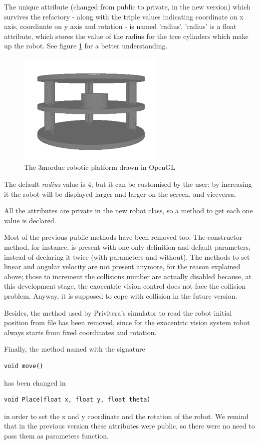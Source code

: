 %
The unique attribute (changed from public to private, in 
the new version) which survives the refactory - along with the
triple values indicating coordinate on x axis, coordinate on 
y axis and rotation - is named 'radius'. 'radius' is a float
attribute, which stores the value of the radius for the 
tree cylinders which make up the robot. See figure
\ref{fig:3morduc_opengl} for a better understanding.
%
\begin{figure}[!h]
  \begin{center}
    \includegraphics[width=200pt]{img/3morduc_opengl.png}  %
    \caption{The 3morduc robotic platform drawn in OpenGL}
    \label{fig:3morduc_opengl}
  \end{center}
\end{figure}
%
The default \textit{radius} value is 4, but it can be 
customised by the user: by increasing it the robot will be 
displayed larger and larger on the screen, and viceversa.
%

%
All the attributes are private in the new robot class, 
so a method to get each one value is declared. 
%

%
Most of the previous public methods have been removed too. 
The constructor method, for instance, is present with one
only definition and default parameters, instead of declaring 
it twice (with parameters and without). The methods to set
linear and angular velocity are not present anymore, for 
the reason explained above; those to increment the collisions 
number are actually disabled because, at this development 
stage, the exocentric vision control does not face the collision 
problem. Anyway, it is supposed to cope with collision in 
the future version.
%

%
Besides, the method used by Privitera's simulator to read 
the robot initial position from file has been removed, since 
for the exocentric vision system robot always starts from 
fixed coordinates and rotation.
%

%
Finally, the method named with the signature 
\begin{verbatim} 
void move() 
\end{verbatim} 
has been changed in 
\begin{verbatim} 
void Place(float x, float y, float theta)
\end{verbatim}
in order to set the x and y coordinate and the rotation of the robot. 
We remind that in the previous version these attributes
were public, so there were no need to pass them as parameters function.

